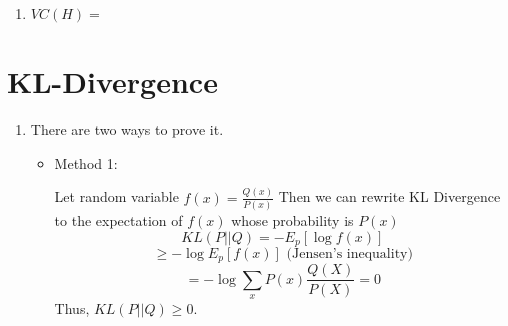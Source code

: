 \documentclass[a4paper, 10pt, titlepage]{article}
\begin{document}
\begin{enumerate}
    \item $VC(H)=$
\end{enumerate}
\section{KL-Divergence}
\begin{enumerate}
    \item There are two ways to prove it.

        \begin{itemize}
                \item Method 1:

                    Let random variable $f(x) = \frac{Q(x)}{P(x)}$ Then we can rewrite KL Divergence to the expectation of $f(x)$ whose probability is $P(x)$
                    $$KL(P||Q) = -E_p[\log{f(x)}] $$
                    $$\geq-\log{E_p[f(x)]}\mbox{~(Jensen's inequality)}$$
                    $$=-\log{\sum_xP(x)\frac{Q(X)}{P(X)}}=0$$
                    Thus, $KL(P||Q) \geq 0$.


\end{itemize}
\end{enumerate}
\end{document}
